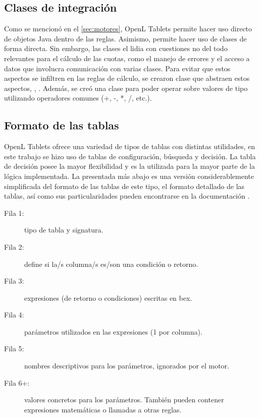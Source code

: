 \subsection{Clases de integración}\label{ssec:integracion:clases}

Como se mencionó en el \cref{sec:motores}, OpenL Tablets permite hacer uso directo de objetos Java dentro de las reglas. 
Asimismo, permite hacer uso de clases de forma directa.
Sin embargo, las clases el {\SIDOSPU} lidia con cuestiones no del todo relevantes para el cálculo de las cuotas, como el manejo de errores y el acceso a datos que involucra comunicación con varias clases. Para evitar que estos aspectos se infiltren en las reglas de cálculo, se crearon clase que abstraen estos aspectos, , . Además, se creó una clase  para poder operar sobre valores de tipo  utilizando operadores comunes (+, -, *, /, etc.).



\subsection{Formato de las tablas}

OpenL Tablets ofrece una variedad de tipos de tablas con distintas utilidades, en este trabajo se hizo uso de tablas de configuración, búsqueda y decisión. 
La tabla de decisión posee la mayor flexibilidad y es la utilizada para la mayor parte de la lógica implementada. La presentada más abajo es una versión considerablemente simplificada del formato de las tablas de este tipo, el formato detallado de las tablas, así como sus particularidades pueden encontrarse en la documentación \cite{openl-decision-table}.

\begin{description}
    \item[Fila 1: ] tipo de tabla y signatura.
    \item[Fila 2: ] define si la/s columna/s es/son una condición o retorno.
    \item[Fila 3: ] expresiones (de retorno o condiciones) escritas en \acrshort{bex}.
    \item[Fila 4: ] parámetros utilizados en las expresiones (1 por columna).
    \item[Fila 5: ] nombres descriptivos para los parámetros, ignorados por el motor.
    \item[Fila 6+:] valores concretos para los parámetros. También pueden contener expresiones matemáticas o llamadas a otras reglas.
\end{description}

